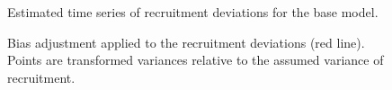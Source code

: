 \documentclass[
]{scrartcl}
\begin{document}
\pagebreak

\begin{figure}[H]


\caption{\label{fig-recdevs}Estimated time series of recruitment
deviations for the base model.}

\end{figure}%

\begin{figure}[H]


\caption{\label{fig-biasramp}Bias adjustment applied to the recruitment
deviations (red line). Points are transformed variances relative to the
assumed variance of recruitment.}

\end{figure}%
\end{document}
